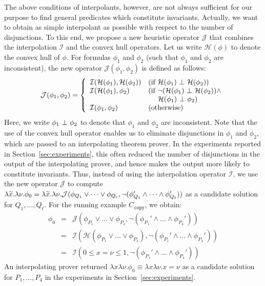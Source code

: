 The above conditions of interpolants, however, are not always sufficient
for our purpose to find general predicates which constitute invariants.
Actually, we want to obtain as simple interpolant as possible with
respect to the number of disjunctions.
To this end, we propose a new heuristic operator \(\mathcal{J}\) that
combines the interpolation \(\mathcal{I}\) and the convex hull operators.
 Let us write \(\mathcal{H}(\phi)\) to denote the convex hull of \(\phi\).
 For formulas \(\phi_1\) and \(\phi_2\) (such that \(\phi_1\) and
\(\phi_2\) are inconsistent), the new operator
\(\mathcal{J}(\phi_1,\phi_2)\) is defined as follows:
\begin{eqnarray*}
\mathcal{J}(\phi_1,\phi_2) =
\left\{
\begin{array}{ll}
\mathcal{I}(\mathcal{H}(\phi_1),\mathcal{H}(\phi_2)) & (\mbox{if~}\mathcal{H}(\phi_1) \ \bot\  \mathcal{H}(\phi_2)) \\
\mathcal{I}(\mathcal{H}(\phi_1),\phi_2) & (\mbox{if~}\neg (\mathcal{H}(\phi_1) \ \bot\  \mathcal{H}(\phi_2)) \land \\
&\ \quad \mathcal{H}(\phi_1) \ \bot\  \phi_2) \\
\mathcal{I}(\phi_1,\phi_2) & (\mbox{otherwise})
\end{array}
\right.
\end{eqnarray*}
Here, we write \(\phi_1 \ \bot\  \phi_2\) to denote that \(\phi_1\) and
\(\phi_2\) are inconsistent.  Note that the use of the convex hull
operator enables us to eliminate disjunctions in \(\phi_1\) and
\(\phi_2\), which are passed to an interpolating theorem prover.
In the experiments reported in Section~\ref{sec:experiments}, this often
reduced the number of disjunctions in the output of the interpolating
prover, and hence makes the output more likely to constitute invariants.
%
Thus, instead of using the interpolation operator \(\mathcal{I}\), we
use the new operator \(\mathcal{J}\) to compute \(\lambda\widetilde{x}.\lambda
\nu.\phi_0=\lambda\widetilde{x}.\lambda \nu.\mathcal{J}(\phi_{Q_1} \lor \dots
\lor \phi_{Q_{\ell}},\neg (\phi_{Q_1}' \land \dots \land
\phi_{Q_{\ell}}'))\) as a candidate solution for \(Q_1,\dots,Q_{\ell}\).
 For the running example \(C_{\texttt{copy}}\), we obtain:
\begin{eqnarray*}
\phi_0 &=& \mathcal{J}(\phi_{P_1} \lor \dots \lor \phi_{P_4},\neg (\phi_{P_1}' \land \dots \land \phi_{P_4}')) \\
&=& \mathcal{I}(\mathcal{H}(\phi_{P_1} \lor \dots \lor \phi_{P_4}),\neg (\phi_{P_1}' \land \dots \land \phi_{P_4}')) \\
&=& \mathcal{I}(0 \leq x=\nu \leq 1,\neg (\phi_{P_1}' \land \dots \land \phi_{P_4}'))
\end{eqnarray*}
An interpolating prover returned \(\lambda x \lambda \nu.\phi_0 \equiv
\lambda x \lambda \nu.x=\nu\) as a candidate solution for
\(P_1,\dots,P_4\) in the experiments in Section~\ref{sec:experiments}.

